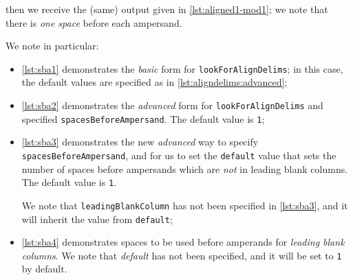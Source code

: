\documentclass[10pt]{article}
\begin{document}
\begin{example}
 then we receive the (same) output given in \cref{lst:aligned1-mod1}; we note that there
 is \emph{one space} before each ampersand.

 \begin{cmhtcbraster}
 \end{cmhtcbraster}

 We note in particular:
 \begin{itemize}
  \item \cref{lst:sba1} demonstrates the \emph{basic} form for
        \texttt{lookForAlignDelims}; in this case,
        the default values are specified as in \vref{lst:aligndelims:advanced};
  \item \cref{lst:sba2} demonstrates the \emph{advanced} form for
        \texttt{lookForAlignDelims}
        and specified \texttt{spacesBeforeAmpersand}. The default value is \texttt{1};
  \item \cref{lst:sba3} demonstrates the new \emph{advanced} way to specify
        \texttt{spacesBeforeAmpersand}, and
        for us to set the \texttt{default} value that sets the number of spaces before ampersands
        which are \emph{not} in leading blank columns. The default value is \texttt{1}.

        We note that \texttt{leadingBlankColumn} has not been specified in
        \cref{lst:sba3}, and it will inherit the value from \texttt{default};
  \item \cref{lst:sba4} demonstrates spaces to be used before amperands for
        \emph{leading blank columns}.
        We note that \emph{default} has not been specified, and it will be set to \texttt{1} by
        default.
 \end{itemize}
 \end{example}
\end{document}
